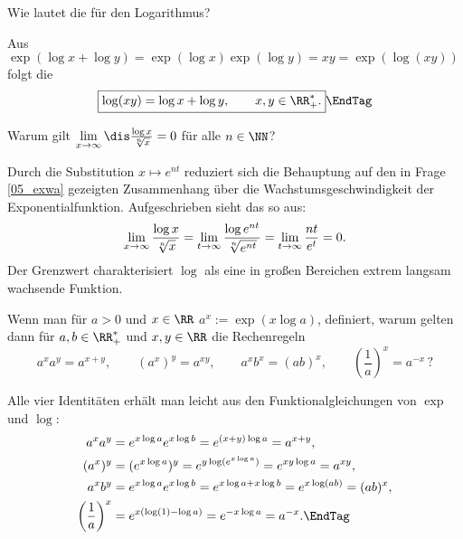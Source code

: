 \begin{frage}
  Wie lautet die  für den Logarithmus?
\end{frage}

\begin{antwort}
  Aus $\exp( \log x+\log y )= 
  \exp(\log x)\exp( \log y)=xy= \exp( \log(xy) )$ folgt die 
  \[
  \boxed{
    \log(xy) = \log x+ \log y, \qquad x,y\in\RR_+^*.
  }\EndTag
  \]
\end{antwort}

\begin{frage}\label{05_lnwa}
  Warum gilt $\lim\limits_{x\to\infty} \dis \frac{\log x}{\sqrt[n]{x}}=0$ 
  für alle $n\in\NN$?
\end{frage}

\begin{antwort}
  Durch die Substitution $x\mapsto e^{nt}$ reduziert sich 
  die Behauptung auf den in Frage \ref{05_exwa} 
  gezeigten Zusammenhang über die Wachstumsgeschwindigkeit der 
  Exponentialfunktion. Aufgeschrieben sieht das so aus:
  \begin{equation}
    \lim_{x\to\infty} \frac{\log x}{\sqrt[n]{x}} =
    \lim_{t\to\infty} \frac{\log e^{nt}}{\sqrt[n]{e^{nt}}} = 
    \lim_{t\to\infty} \frac{nt}{e^t} = 0. \notag
  \end{equation}
  Der Grenzwert charakterisiert $\log$ als eine in großen Bereichen 
  extrem langsam wachsende Funktion. \AntEnd
\end{antwort}

\begin{frage}
  Wenn man für $a>0$ und $x\in\RR$ $a^x := \exp( x\log a )$, 
  definiert, warum gelten dann für $a,b\in\RR_+^*$ und $x,y\in\RR$ die 
  Rechenregeln
  \[
  a^xa^y = a^{x+y},\qquad
  (a^x)^y = a^{xy},\qquad
  a^x b^x = (ab)^x,\qquad
  \left( \frac{1}{a} \right)^x =a^{-x}\, \text{?}
  \]
\end{frage}

\begin{antwort}
  Alle vier Identitäten erhält man leicht aus den Funktionalgleichungen 
  von $\exp$ und $\log$: 
  \begin{align*}
    a^xa^y &= e^{ x\log a } e^{ x\log b } = e^{(x+y)\log a} = a^{x+y}, \\ 
    (a^x)^y &= (e^{x\log a})^y = e^{ y \log( e^{x\log a} )} = 
    e^{xy \log a} =a^{xy}, \\
    a^x b^y &= e^{x\log a}e^{x\log b} = 
    e^{x\log a + x\log b}=e^{x\log(ab)}=(ab)^x,\\ 
    \left(\frac{1}{a}\right)^x &= 
    e^{x( \log(1)-\log a )} = e^{-x\log a} = a^{-x}.\EndTag
  \end{align*}
\end{antwort}


